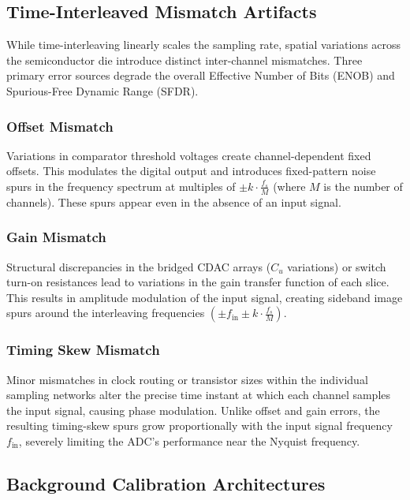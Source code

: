 \subsection{Time-Interleaved Mismatch Artifacts}

While time-interleaving linearly scales the sampling rate, spatial variations across the
semiconductor die introduce distinct inter-channel mismatches. Three primary error sources
degrade the overall Effective Number of Bits (ENOB) and Spurious-Free Dynamic Range (SFDR).

\subsubsection{Offset Mismatch}

Variations in comparator threshold voltages create channel-dependent fixed offsets. This
modulates the digital output and introduces fixed-pattern noise spurs in the frequency spectrum
at multiples of $\pm k \cdot \frac{f_s}{M}$ (where $M$ is the number of channels). These
spurs appear even in the absence of an input signal.

\subsubsection{Gain Mismatch}

Structural discrepancies in the bridged CDAC arrays ($C_u$ variations) or switch turn-on
resistances lead to variations in the gain transfer function of each slice. This results in
amplitude modulation of the input signal, creating sideband image spurs around the
interleaving frequencies $\left(\pm f_{\mathrm{in}} \pm k \cdot \frac{f_s}{M}\right)$.

\subsubsection{Timing Skew Mismatch}

Minor mismatches in clock routing or transistor sizes within the individual sampling networks
alter the precise time instant at which each channel samples the input signal, causing phase
modulation. Unlike offset and gain errors, the resulting timing-skew spurs grow proportionally
with the input signal frequency $f_{\mathrm{in}}$, severely limiting the ADC's performance
near the Nyquist frequency.

\subsection{Background Calibration Architectures}

